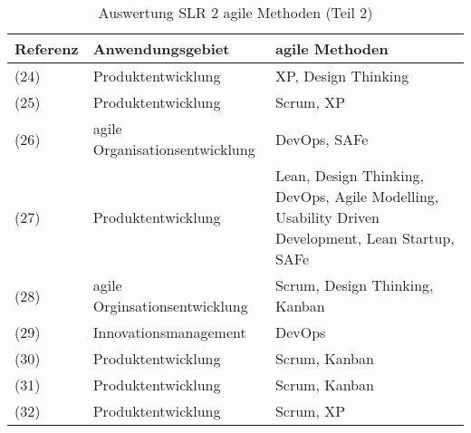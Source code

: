 \begin{sidewaystable}[ht]
	\centering
	\small
	\caption[Auswertung SLR 2 agile Methoden (Teil 2)]{Auswertung SLR 2 agile Methoden (Teil 2) \protect \footnotemark}
	\begin{tabular}{|l|p{10cm}|p{10cm}|}
		\hline
		\textbf{Referenz}                                            & \textbf{Anwendungsgebiet}                                                                                                &\textbf{agile Methoden}                                                                       \\
		\hline
		(24)                                & Produktentwicklung                                                                                                 & XP, Design Thinking                                                                              \\
		(25)      & Produktentwicklung                                                                                                 & Scrum, XP                                                                                        \\
		(26)                                 & agile Organisationsentwicklung                                                                                     & DevOps, SAFe                                                                                     \\
		(27)                   & Produktentwicklung                                                                                                 & Lean, Design Thinking, DevOps, Agile Modelling, Usability Driven Development, Lean Startup, SAFe \\
		(28)                                  & agile Orginsationsentwicklung                                                                                      & Scrum, Design Thinking, Kanban                                                                   \\
		(29)            & Innovationsmanagement                                                                                              & DevOps                                                                                           \\
		(30)                              & Produktentwicklung                                                                                                 & Scrum, Kanban                                                                                    \\
		(31) & Produktentwicklung                                                                                                 & Scrum, Kanban                                                                                    \\
		(32)                  & Produktentwicklung                                                                                                 & Scrum, XP                                                                                       \\
		\hline
	\end{tabular}
	\label{tab:clusteringslr2-2}
\end{sidewaystable}
